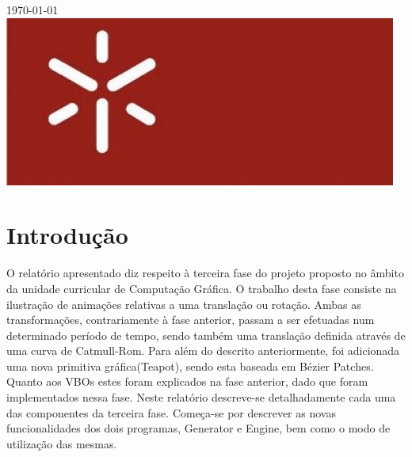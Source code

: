 \documentclass[12pt]{article}
\begin{document}
\begin{titlepage}

{\large \today}\\[2cm]


\includegraphics[scale=0.3]{uminho}\\
    

\vfill %

\end{titlepage}

\tableofcontents
\newpage
\section{Introdução}
O relatório apresentado diz respeito à terceira fase do projeto proposto no âmbito da unidade curricular de
Computação Gráfica. O trabalho desta fase consiste na ilustração de animações relativas a uma
translação ou rotação. Ambas as transformações, contrariamente à fase anterior, passam a ser 
efetuadas num determinado período de tempo, sendo também uma translação definida através de
uma curva de Catmull-Rom.
Para além do descrito anteriormente, foi adicionada uma nova primitiva gráfica(Teapot), sendo esta baseada em Bézier Patches.
Quanto aos VBOs estes foram explicados na fase anterior, dado que foram implementados nessa fase.
Neste relatório descreve-se detalhadamente cada uma das componentes da
terceira fase. Começa-se por descrever as novas funcionalidades dos dois programas, Generator e Engine, bem como 
o modo de utilização das mesmas.
\newpage
\end{document}
